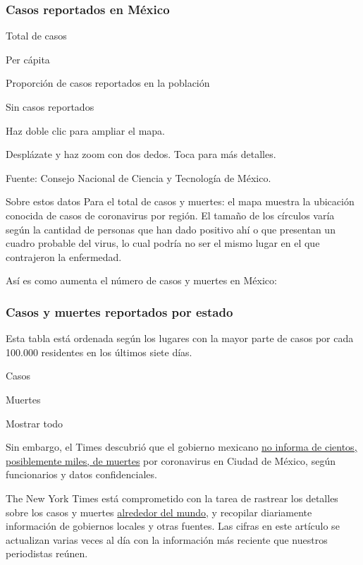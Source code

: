 \hypertarget{casos-reportados-en-muxe9xico}{%
\subsubsection{Casos reportados en
México}\label{casos-reportados-en-muxe9xico}}

Total de casos

Per cápita

Proporción de casos reportados en la población

Sin casos reportados

Haz doble clic para ampliar el mapa.

Desplázate y haz zoom con dos dedos. Toca para más detalles.

Fuente: Consejo Nacional de Ciencia y Tecnología de México.

Sobre estos datos Para el total de casos y muertes: el mapa muestra la
ubicación conocida de casos de coronavirus por región. El tamaño de los
círculos varía según la cantidad de personas que han dado positivo ahí o
que presentan un cuadro probable del virus, lo cual podría no ser el
mismo lugar en el que contrajeron la enfermedad.

Así es como aumenta el número de casos y muertes en México:

\hypertarget{casos-y-muertes-reportados-por-estado}{%
\subsubsection{Casos y muertes reportados por
estado}\label{casos-y-muertes-reportados-por-estado}}

Esta tabla está ordenada según los lugares con la mayor parte de casos
por cada 100.000 residentes en los últimos siete días.

Casos

Muertes

Mostrar todo

Sin embargo, el Times descubrió que el gobierno mexicano
\href{https://www.nytimes3xbfgragh.onion/es/2020/05/08/espanol/america-latina/mexico-coronavirus.html}{no
informa de cientos, posiblemente miles, de muertes} por coronavirus en
Ciudad de México, según funcionarios y datos confidenciales.

The New York Times está comprometido con la tarea de rastrear los
detalles sobre los casos y muertes
\href{https://www.nytimes3xbfgragh.onion/interactive/2020/world/coronavirus-maps.html}{alrededor
del mundo}, y recopilar diariamente información de gobiernos locales y
otras fuentes. Las cifras en este artículo se actualizan varias veces al
día con la información más reciente que nuestros periodistas reúnen.

